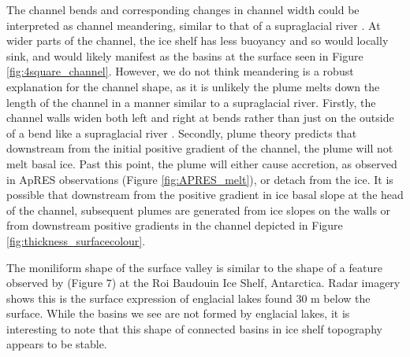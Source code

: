 The channel bends and corresponding changes in channel width could be interpreted as channel meandering, similar to that of a supraglacial river \cite [e.g.][] {ferguson1973sinuosity}. 
At wider parts of the channel, the ice shelf has less buoyancy and so would locally sink, and would likely manifest as the basins at the surface seen in Figure \ref{fig:4square_channel}. However, we do not think meandering is a robust explanation for the channel shape, as it is unlikely the plume melts down the length of the channel in a manner similar to a supraglacial river. 
Firstly, the channel walls widen both left and right at bends rather than just on the outside of a bend like a supraglacial river \citep{ferguson1973sinuosity}.
Secondly, plume theory predicts that downstream from the initial positive gradient of the channel, the plume will not melt basal ice. Past this point, the plume will either cause accretion, as observed in ApRES observations (Figure \ref{fig:APRES_melt}), or detach from the ice.  It is possible that downstream from the positive gradient in ice basal slope at the head of the channel, subsequent plumes are generated from ice slopes on the walls or from downstream positive gradients in the channel depicted in Figure \ref{fig:thickness_surfacecolour}. 

The moniliform shape of the surface valley is similar to the shape of a feature observed by \cite{berger2017detecting} (Figure 7) at the Roi Baudouin Ice Shelf, Antarctica. Radar imagery shows this is the surface expression of englacial lakes found 30 m below the surface. While the basins we see are not formed by englacial lakes, it is interesting to note that this shape of connected basins in ice shelf topography appears to be stable. 


